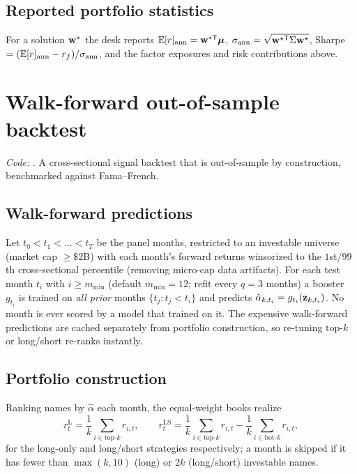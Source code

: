 \documentclass[11pt]{article}
\begin{document}
\subsection{Reported portfolio statistics}
For a solution $\mathbf{w}^\star$ the desk reports
$\mathbb{E}[r]_{\text{ann}}=\mathbf{w}^{\star\mathsf T}\boldsymbol{\mu}$,
$\sigma_{\text{ann}}=\sqrt{\mathbf{w}^{\star\mathsf T}\Sigma\mathbf{w}^\star}$, Sharpe
$=(\mathbb{E}[r]_{\text{ann}}-r_f)/\sigma_{\text{ann}}$, and the factor exposures and
risk contributions above.

\section{Walk-forward out-of-sample backtest}
\label{sec:bt}
\emph{Code:} . A cross-sectional signal
backtest that is out-of-sample by construction, benchmarked against Fama--French.

\subsection{Walk-forward predictions}
Let $t_0<t_1<\dots<t_T$ be the panel months, restricted to an investable universe
(market cap $\ge\$2$B) with each month's forward returns winsorized to the
$1$st/$99$th cross-sectional percentile (removing micro-cap data artifacts). For
each test month $t_i$ with $i\ge m_{\min}$ (default $m_{\min}=12$; refit every
$q=3$ months) a booster $g_{t_i}$ is trained on \emph{all prior} months
$\{t_j:t_j<t_i\}$ and predicts $\hat\alpha_{k,t_i}=g_{t_i}(\mathbf{z}_{k,t_i})$. No month
is ever scored by a model that trained on it. The expensive walk-forward
predictions are cached separately from portfolio construction, so re-tuning
$\text{top-}k$ or long/short re-ranks instantly.

\subsection{Portfolio construction}
Ranking names by $\hat\alpha$ each month, the equal-weight books realize
\begin{equation}
  r^{\text{L}}_{t}=\frac1k\!\!\sum_{i\in\text{top-}k}\!\! r_{i,t},
  \qquad
  r^{\text{LS}}_{t}=\frac1k\!\!\sum_{i\in\text{top-}k}\!\! r_{i,t}
  -\frac1k\!\!\sum_{i\in\text{bot-}k}\!\! r_{i,t},
\end{equation}
for the long-only and long/short strategies respectively; a month is skipped if
it has fewer than $\max(k,10)$ (long) or $2k$ (long/short) investable names.
\end{document}

